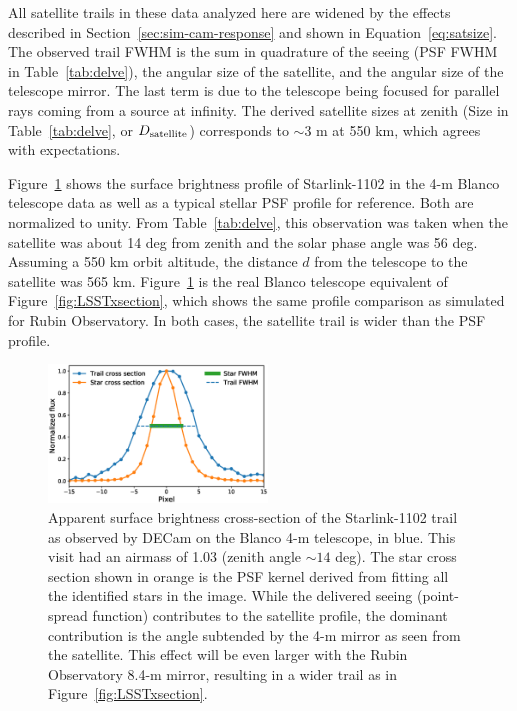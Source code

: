 \documentclass[twocolumn,trackchanges]{aastex63}
\begin{document}
All satellite trails in these data analyzed here are widened by the effects described in Section~\ref{sec:sim-cam-response} and shown in Equation~\ref{eq:satsize}. The observed trail FWHM is the sum in quadrature of the seeing (PSF FWHM in Table~\ref{tab:delve}), the angular size of the satellite, and the angular size of the telescope mirror. The last term is due to the telescope being focused for parallel rays coming from a source at infinity. The derived satellite sizes at zenith (Size in Table~\ref{tab:delve}, or $ D_{\rm satellite}$) corresponds to $\sim3$ m at 550 km, which agrees with expectations.

Figure~\ref{fig:xsection} shows the surface brightness profile of Starlink-1102 in the 4-m Blanco telescope data as well as a typical stellar PSF profile for reference. Both are normalized to unity. From Table~\ref{tab:delve}, this observation was taken when the satellite was about 14 deg from zenith and the solar phase angle was 56 deg. Assuming a 550 km orbit altitude, the distance $d$ from the telescope to the satellite was 565 km. Figure~\ref{fig:xsection} is the real Blanco telescope equivalent of Figure~\ref{fig:LSSTxsection}, which shows the same profile comparison as simulated for Rubin Observatory. In both cases, the satellite trail is wider than the PSF profile.

\begin{figure}[ht]
\includegraphics[trim=+1cm 0 0 0, width=0.52\textwidth]{brightness-profile-alt.eps}
\caption{Apparent surface brightness cross-section of the Starlink-1102 trail as observed by DECam on the Blanco 4-m telescope, in blue. This visit had an airmass of 1.03 (zenith angle $\sim14$ deg). The star cross section shown in orange is the PSF kernel derived from fitting all the identified stars in the image. While the delivered seeing (point-spread function) contributes to the satellite profile, the dominant contribution is the angle subtended by the 4-m mirror as seen from the satellite. This effect will be even larger with the Rubin Observatory 8.4-m mirror, resulting in a wider trail as in Figure~\ref{fig:LSSTxsection}. \label{fig:xsection}}
\end{figure}
\end{document}
